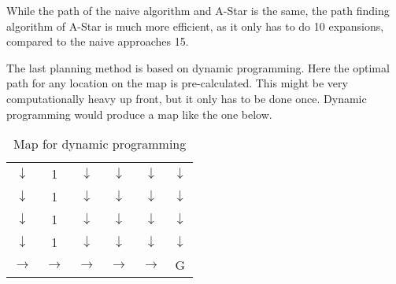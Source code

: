 \documentclass[Main]{subfiles}
\begin{document}
While the path of the naive algorithm and A-Star is the same, the path finding algorithm of A-Star is much more efficient, as it only has to do 10 expansions, compared to the naive approaches 15.

The last planning method is based on dynamic programming. 
Here the optimal path for any location on the map is pre-calculated. 
This might be very computationally heavy up front, but it only has to be done once. 
Dynamic programming would produce a map like the one below.
\begin{table}[H]
	\centering
	\begin{tabular}{cccccc}
		$\downarrow$ & 1 & $\downarrow$ & $\downarrow$ & $\downarrow$ & $\downarrow$  \\ 
		$\downarrow$ & 1 & $\downarrow$ & $\downarrow$ & $\downarrow$ & $\downarrow$  \\ 
		$\downarrow$ & 1 & $\downarrow$ & $\downarrow$ & $\downarrow$ & $\downarrow$  \\ 
		$\downarrow$ & 1 & $\downarrow$ & $\downarrow$ & $\downarrow$ & $\downarrow$  \\  
		$\rightarrow$ & $\rightarrow$ & $\rightarrow$ & $\rightarrow$ & $\rightarrow$ & G  \\ 
	\end{tabular}
\caption{Map for dynamic programming}
\label{table:dynamic_map} 
\end{table} \noindent
\end{document}
